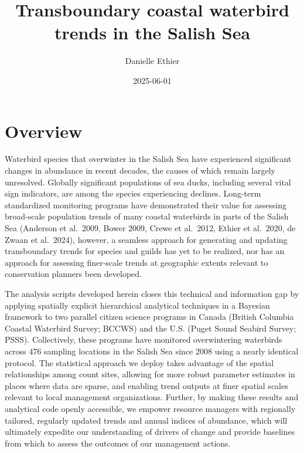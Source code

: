 \documentclass[
  letterpaper,
  DIV=11,
  numbers=noendperiod]{scrreprt}
\title{Transboundary coastal waterbird trends in the Salish Sea}
\author{Danielle Ethier}
\date{2025-06-01}
\renewcommand*\contentsname{Table of contents}
\newcommand\contentsname{Table of contents}
\begin{document}
\maketitle

\renewcommand*\contentsname{Table of contents}
{
\hypersetup{linkcolor=}
\setcounter{tocdepth}{2}
\tableofcontents
}


\chapter{Overview}\label{overview}

Waterbird species that overwinter in the Salish Sea have experienced
significant changes in abundance in recent decades, the causes of which
remain largely unresolved. Globally significant populations of sea
ducks, including several vital sign indicators, are among the species
experiencing declines. Long-term standardized monitoring programs have
demonstrated their value for assessing broad-scale population trends of
many coastal waterbirds in parts of the Salish Sea (Anderson et
al.~2009, Bower 2009, Crewe et al.~2012, Ethier et al.~2020, de Zwaan et
al.~2024), however, a seamless approach for generating and updating
transboundary trends for species and guilds has yet to be realized, nor
has an approach for assessing finer-scale trends at geographic extents
relevant to conservation planners been developed.

The analysis scripts developed herein closes this technical and
information gap by applying spatially explicit hierarchical analytical
techniques in a Bayesian framework to two parallel citizen science
programs in Canada (British Columbia Coastal Waterbird Survey; BCCWS)
and the U.S. (Puget Sound Seabird Survey; PSSS). Collectively, these
programs have monitored overwintering waterbirds across 476 sampling
locations in the Salish Sea since 2008 using a nearly identical
protocol. The statistical approach we deploy takes advantage of the
spatial relationships among count sites, allowing for more robust
parameter estimates in places where data are sparse, and enabling trend
outputs at finer spatial scales relevant to local management
organizations. Further, by making these results and analytical code
openly accessible, we empower resource managers with regionally
tailored, regularly updated trends and annual indices of abundance,
which will ultimately expedite our understanding of drivers of change
and provide baselines from which to assess the outcomes of our
management actions.
\end{document}
